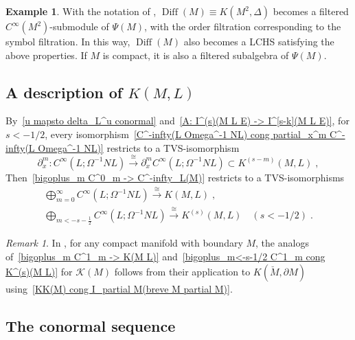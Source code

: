\documentclass{memo-l}
\theoremstyle{plain}
\theoremstyle{definition}
\newtheorem{ex}[thm]{Example}
\theoremstyle{remark}
\newtheorem{rem}[thm]{Remark}
\newcommand{\KK}{\mathcal{K}}
\newcommand{\Diff}{\operatorname{Diff}}
\numberwithin{section}{chapter}
\numberwithin{equation}{section}%
\begin{document}
\begin{ex}\label{ex: Diff(M)}
With the notation of , $\Diff(M)\equiv K(M^2,\Delta)$ becomes a filtered $C^\infty(M^2)$-submodule of $\Psi(M)$, with the order filtration corresponding to the symbol filtration. In this way, $\Diff(M)$ also becomes a LCHS satisfying the above properties. If $M$ is compact, it is also a filtered subalgebra of $\Psi(M)$.
\end{ex}


\subsection{A description of $K(M,L)$}\label{ss: description of K(M L)}

By~\eqref{u mapsto delta_L^u conormal} and~\eqref{A: I^(s)(M L E) -> I^[s-k](M L E)}, for $s<-1/2$, every isomorphism~\eqref{C^-infty(L Omega^-1 NL) cong partial_x^m C^-infty(L Omega^-1 NL)} restricts to a TVS-isomorphism 
\begin{equation}\label{C^infty(L Omega^-1 NL) cong partial_x^m C^infty(L Omega^-1 NL)}
\partial_x^m:C^\infty(L;\Omega^{-1}NL)\xrightarrow{\cong}\partial_x^mC^\infty(L;\Omega^{-1}NL)
\subset K^{(s-m)}(M,L)\;,
\end{equation}
Then~\eqref{bigoplus_m C^0_m -> C^-infty_L(M)} restricts to a TVS-isomorphisms \cite[Proposition~7.26]{AlvKordyLeichtnam-conormal}
\begin{gather}
\bigoplus_{m=0}^\infty C^\infty(L;\Omega^{-1}NL)\xrightarrow{\cong}K(M,L)\;,\label{bigoplus_m C^1_m -> K(M L)}\\
\bigoplus_{m<-s-\frac12}C^\infty(L;\Omega^{-1}NL)\xrightarrow{\cong}K^{(s)}(M,L)\quad(s<-1/2)\;.\label{bigoplus_m<-s-1/2 C^1_m cong K^(s)(M L)}
\end{gather}

\begin{rem}\label{r: description of KK(M)}
In , for any compact manifold with boundary $M$, the analogs of~\eqref{bigoplus_m C^1_m -> K(M L)} and~\eqref{bigoplus_m<-s-1/2 C^1_m cong K^(s)(M L)} for $\KK(M)$ follows from their application to $K(\breve M,\partial M)$ using~\eqref{KK(M) cong I_partial M(breve M partial M)}.
\end{rem}



\subsection{The conormal sequence}\label{conormal sequence}
\end{document}
